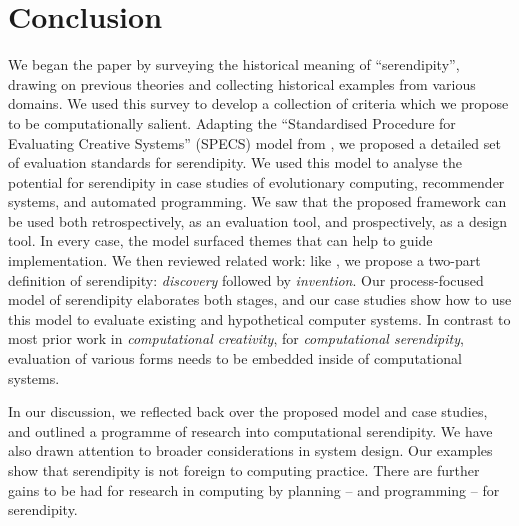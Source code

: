 \section{Conclusion} \label{sec:conclusion}

%
We began the paper by surveying the historical meaning of
``serendipity'', drawing on previous theories and collecting
historical examples from various domains.  We used this survey to
develop a collection of criteria which we propose to be
computationally salient.
%
Adapting the ``Standardised Procedure for Evaluating Creative
Systems'' (SPECS) model from , we proposed a
detailed set of evaluation standards for serendipity.
%
We used this model to analyse the potential for serendipity in case
studies of evolutionary computing, recommender systems, and automated
programming.  We saw that the proposed framework can be used both
retrospectively, as an evaluation tool, and prospectively, as a design
tool.  In every case, the model surfaced themes that can help to guide
implementation.
%
We then reviewed related work: like , we
propose a two-part definition of serendipity: \emph{discovery}
followed by \emph{invention}.  Our process-focused model of
serendipity elaborates both stages, and our case studies show how to
use this model to evaluate existing and hypothetical computer systems.
In contrast to most prior work in \emph{computational creativity}, for
\emph{computational serendipity}, evaluation of various forms needs to
be embedded inside of computational systems.

In our discussion, we reflected back over the proposed model and case
studies, and outlined a programme of research into computational
serendipity.  We have also drawn attention to broader considerations
in system design.  Our examples show that serendipity is not foreign
to computing practice.  There are further gains to be had for research
in computing by planning -- and programming -- for serendipity.


